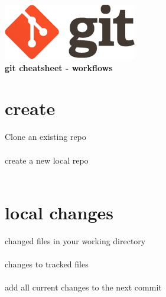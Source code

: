 \documentclass[12pt,landscape]{article}
\begin{document}
\raggedright
\footnotesize
\begin{multicols*}{3}

\setlength{\premulticols}{1pt}
\setlength{\postmulticols}{1pt}
\setlength{\multicolsep}{1pt}
\setlength{\columnsep}{2pt}


\begin{center}
  \includegraphics{./resources/logo@2x} \\
  {\color{solarized_blue} \Large{\textbf{git cheatsheet - workflows}}} \\
\end{center}


\section{create}

Clone an existing repo \\
 \\

create a new local repo \\
 \\

\section{local changes}

changed files in your working directory \\
 \\

changes to tracked files \\
 \\

add all current changes to the next commit \\
 \\


\end{multicols*}
\end{document}
